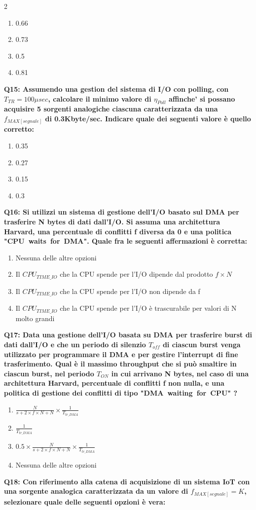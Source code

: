 \documentclass[10pt]{article}
\begin{document}
\begin{multicols}{2}
\begin{enumerate}[label=\arabic*.]
\item 0.66
\item 0.73
\item 0.5
\item 0.81
\end{enumerate}
\textbf{Q15: Assumendo una gestion del sistema di I/O con polling, con $T_{TR}=100\mu sec$, calcolare il minimo valore di $\eta_{Poll}$ affinche' si possano acquisire 5 sorgenti analogiche ciascuna caratterizzata da una $f_{MAX[segnale]}$ di 0.3Kbyte/sec.  Indicare quale dei seguenti valore è quello corretto:}

\begin{enumerate}[label=\arabic*.]
\item 0.35
\item 0.27
\item 0.15
\item 0.3
\end{enumerate}
\textbf{Q16: Si utilizzi un sistema di gestione dell’I/O basato sul DMA per trasferire N bytes di dati dall’I/O. Si assuma una architettura Harvard, una percentuale di conflitti f diversa da 0 e una politica "CPU waits for DMA". Quale fra le seguenti affermazioni è corretta:}

\begin{enumerate}[label=\arabic*.]
\item Nessuna delle altre opzioni
\item Il $CPU_{TIME\_IO}$ che la CPU spende per l’I/O dipende dal prodotto $f \times N$
\item Il $CPU_{TIME\_IO}$ che la CPU spende per l’I/O non dipende da f
\item Il $CPU_{TIME\_IO}$ che la CPU spende per l’I/O è trascurabile per valori di N molto grandi
\end{enumerate}
\textbf{Q17: Data una gestione dell’I/O basata su DMA per trasferire burst di dati dall’I/O e che un periodo di silenzio $T_{off}$ di ciascun burst venga utilizzato per programmare il DMA e per gestire l’interrupt di fine trasferimento. Qual è il massimo throughput che si può smaltire in ciascun burst, nel periodo $T_{ON}$ in cui arrivano N bytes, nel caso di una architettura Harvard, percentuale di conflitti f non nulla, e una politica di gestione dei conflitti di tipo "DMA waiting for CPU" ?}

\begin{enumerate}[label=\arabic*.]
\item $\frac{N}{s+ 2 \times f \times N + N} \times \frac{1}{T_{tr\_DMA}} $
\item $\frac{1}{T_{tr\_DMA}}$
\item $0.5 \times \frac{N}{s+ 2 \times f \times N + N} \times \frac{1}{T_{tr\_DMA}} $
\item Nessuna delle altre opzioni
\end{enumerate}
\textbf{Q18: Con riferimento alla catena di acquisizione di un sistema IoT con una sorgente analogica caratterizzata da un valore di $f_{MAX[segnale]} = K$, selezionare quale delle seguenti opzioni è vera:}


\end{multicols}
\end{document}
